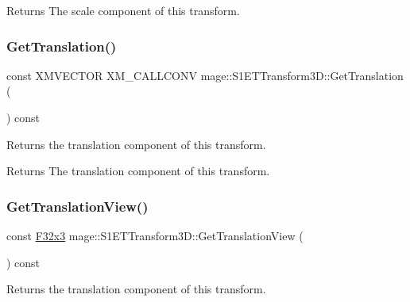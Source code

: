 \begin{DoxyReturn}{Returns}
The scale component of this transform. 
\end{DoxyReturn}
\mbox{\label{classmage_1_1_s1_e_t_transform3_d_aa944acb8dc7ae0f5b3b204a02a964059}} 
\subsubsection{\texorpdfstring{Get\+Translation()}{GetTranslation()}}
{\footnotesize\ttfamily const X\+M\+V\+E\+C\+T\+OR X\+M\+\_\+\+C\+A\+L\+L\+C\+O\+NV mage\+::\+S1\+E\+T\+Transform3\+D\+::\+Get\+Translation (\begin{DoxyParamCaption}{ }\end{DoxyParamCaption}) const\hspace{0.3cm}{\ttfamily [noexcept]}}

Returns the translation component of this transform.

\begin{DoxyReturn}{Returns}
The translation component of this transform. 
\end{DoxyReturn}
\mbox{\label{classmage_1_1_s1_e_t_transform3_d_aa4b6b72bedef3ff20f56ad5309869b15}} 
\subsubsection{\texorpdfstring{Get\+Translation\+View()}{GetTranslationView()}}
{\footnotesize\ttfamily const \mbox{\hyperlink{namespacemage_a1e3c7a882af461f161caa1cbddaf1fa2}{F32x3}} mage\+::\+S1\+E\+T\+Transform3\+D\+::\+Get\+Translation\+View (\begin{DoxyParamCaption}{ }\end{DoxyParamCaption}) const\hspace{0.3cm}{\ttfamily [noexcept]}}

Returns the translation component of this transform.

